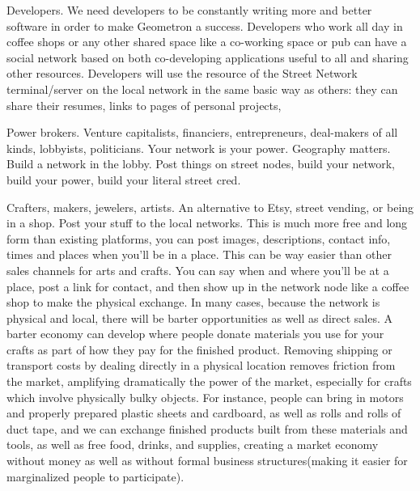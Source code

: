 Developers.  We need developers to be constantly writing more and better software in order to make Geometron a success. Developers who work all day in coffee shops or any other shared space like a co-working space or pub can have a social network based on both co-developing applications useful to all and sharing other resources.  Developers will use the resource of the Street Network terminal/server on the local network in the same basic way as others: they can share their resumes, links to pages of personal projects,

Power brokers. Venture capitalists, financiers, entrepreneurs, deal-makers of all kinds, lobbyists, politicians.  Your network is your power.  Geography matters.  Build a network in the lobby.  Post things on street nodes, build your network, build your power, build your literal street cred. 

Crafters, makers, jewelers, artists.  An alternative to Etsy, street vending, or being in a shop.  Post your stuff to the local networks.  This is much more free and long form than existing platforms, you can post images, descriptions, contact info, times and places when you'll be in a place.  This can be way easier than other sales channels for arts and crafts.  You can say when and where you'll be at a place, post a link for contact, and then show up in the network node like a coffee shop to make the physical exchange.  In many cases, because the network is physical and local, there will be barter opportunities as well as direct sales.  A barter economy can develop where people donate materials you use for your crafts as part of how they pay for the finished product.  Removing shipping or transport costs by dealing directly in a physical location removes friction from the market, amplifying dramatically the power of the market, especially for crafts which involve physically bulky objects.  For instance, people can bring in motors and properly prepared plastic sheets and cardboard, as well as rolls and rolls of duct tape, and we can exchange finished products built from these materials and tools, as well as free food, drinks, and supplies, creating a market economy without money as well as without formal business structures(making it easier for marginalized people to participate).

